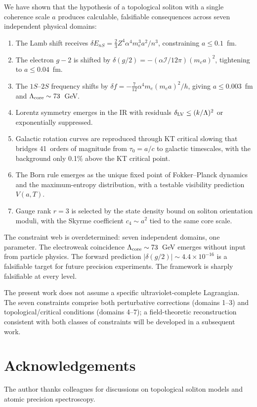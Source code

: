 ﻿\documentclass[a4paper,12pt]{article}
\begin{document}
We have shown that the hypothesis of a topological soliton with a
single coherence scale $a$ produces calculable, falsifiable consequences
across seven independent physical domains:

\begin{enumerate}
  \item The Lamb shift receives $\delta E_{nS}=\tfrac{2}{3}Z^4\alpha^4m_e^3a^2/n^3$,
    constraining $a\leq 0.1$~fm.
  \item The electron $g{-}2$ is shifted by
    $\delta(g/2)=-(\alpha\mathcal{I}/12\pi)(m_ea)^2$,
    tightening to $a\leq 0.04$~fm.
  \item The $1S$--$2S$ frequency shifts by
    $\delta f=-\tfrac{7}{12}\alpha^4m_e(m_ea)^2/h$,
    giving $a\leq 0.003$~fm and $\Lambda_{\rm core}\sim 73$~GeV.
  \item Lorentz symmetry emerges in the IR with residuals
    $\delta_{\rm LV}\leq(k/\Lambda)^2$ or exponentially suppressed.
  \item Galactic rotation curves are reproduced through KT critical
    slowing that bridges 41~orders of magnitude from $\tau_0=a/c$ to
    galactic timescales, with the background only 0.1\% above the
    KT critical point.
  \item The Born rule emerges as the unique fixed point of
    Fokker--Planck dynamics and the maximum-entropy distribution, with
    a testable visibility prediction $V(a,T)$.
  \item Gauge rank $r=3$ is selected by the state density bound on
    soliton orientation moduli, with the Skyrme coefficient $c_4\sim a^2$
    tied to the same core scale.
\end{enumerate}

The constraint web is overdetermined: seven independent domains,
one parameter.  The electroweak coincidence $\Lambda_{\rm core}\sim 73$~GeV
emerges without input from particle physics.  The forward prediction
$|\delta(g/2)|\sim 4.4\times 10^{-16}$ is a falsifiable target for
future precision experiments.  The framework is sharply falsifiable at every level.

The present work does not assume a specific ultraviolet-complete
Lagrangian.  The seven constraints comprise both perturbative
corrections (domains 1--3) and topological/critical conditions
(domains 4--7); a field-theoretic reconstruction consistent with
both classes of constraints will be developed in a subsequent work.

\section*{Acknowledgements}
The author thanks colleagues for discussions on topological soliton
models and atomic precision spectroscopy.
\end{document}
